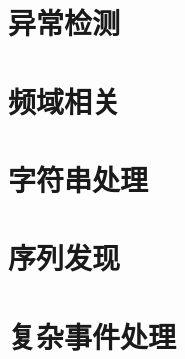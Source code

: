 \documentclass[cn,11pt,mode=simple,table]{elegantbook}
\begin{document}
\chapter{异常检测}








\chapter{频域相关}









\chapter{字符串处理}






\chapter{序列发现}




\chapter{复杂事件处理}







\end{document}
